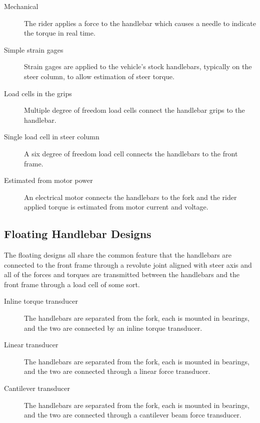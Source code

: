 \documentclass[10pt]{article}
\begin{document}
\begin{description}
  \item[Mechanical] The rider applies a force to the handlebar which causes a
    needle to indicate the torque in real
    time.~\cite{Wilson-Jones1951,Cheng2003,Moore2012}
  \item[Simple strain gages] Strain gages are applied to the vehicle's stock
    handlebars, typically on the steer column, to allow estimation of steer
    torque.~\cite{Eaton1973,Lorenzo1997,Capitani2006}
  \item[Load cells in the grips] Multiple degree of freedom load cells connect
    the handlebar grips to the handlebar.~\cite{Evertse2010}
  \item[Single load cell in steer column] A six degree of freedom load cell
    connects the handlebars to the front frame.~\cite{Kageyama?}
  \item[Estimated from motor power] An electrical motor connects the handlebars
    to the fork and the rider applied torque is estimated from motor current
    and voltage.~\cite{Iuchi2006,Appelman2012,Peterson2013}
\end{description}


\subsection*{Floating Handlebar Designs}

The floating designs all share the common feature that the handlebars are
connected to the front frame through a revolute joint aligned with steer axis
and all of the forces and torques are transmitted between the handlebars and the
front frame through a load cell of some sort.

\begin{description}
  \item[Inline torque transducer] The handlebars are separated from the fork,
    each is mounted in bearings, and the two are connected by an inline torque
    transducer.~\cite{Weir1979a,Cain2010,Cain2012,Moore2012}
  \item[Linear transducer] The handlebars are separated from the fork, each is
    mounted in bearings, and the two are connected through a linear force
    transducer.~\cite{Cheng2003,James2002,Teerhuis2010}
  \item[Cantilever transducer] The handlebars are separated from the fork, each
    is mounted in bearings, and the two are connected through a cantilever beam
    force transducer.~ \cite{Bortoluzzi2000,Biral2003,Ouden2011}
\end{description}
\end{document}
